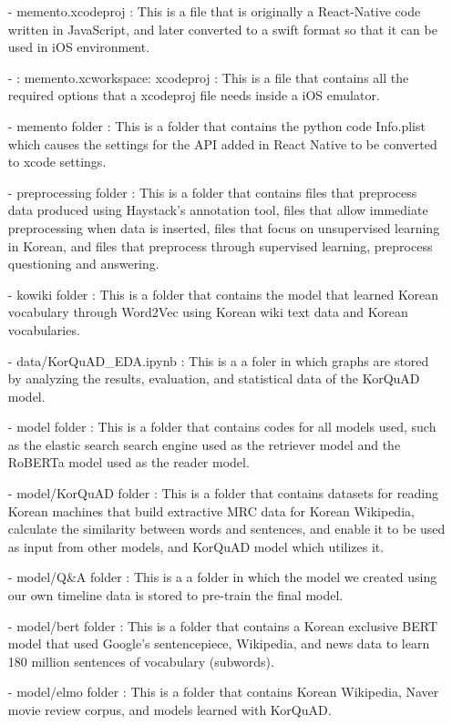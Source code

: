 \documentclass[conference]{IEEEtran}
\begin{document}
\begin{enumerate}
        \item[-] memento.xcodeproj : This is a file that is originally a React-Native code written in JavaScript, and later converted to a swift format so that it can be used in iOS environment.\\
        \item[-] : memento.xcworkspace: xcodeproj : This is a file that contains all the required options that a xcodeproj file needs inside a iOS emulator.\\
        \item[-] memento folder : This is a folder that contains the python code Info.plist which causes the settings for the API added in React Native to be converted to xcode settings.\\
        \item[-] preprocessing folder : This is a folder that contains files that preprocess data produced using Haystack's annotation tool, files that allow immediate preprocessing when data is inserted, files that focus on unsupervised learning in Korean, and files that preprocess through supervised learning, preprocess questioning and answering.\\
        \item [-] kowiki folder : This is a folder that contains the model that learned Korean vocabulary through Word2Vec using Korean wiki text data and Korean vocabularies.\\
        \item [-] data/KorQuAD\_EDA.ipynb : This is a a foler in which graphs are stored by analyzing the results, evaluation, and statistical data of the KorQuAD model.\\
        \item [-] model folder : This is a folder that contains codes for all models used, such as the elastic search search engine used as the retriever model and the RoBERTa model used as the reader model.\\
        \item [-] model/KorQuAD folder : This is a folder that contains datasets for reading Korean machines that build extractive MRC data for Korean Wikipedia, calculate the similarity between words and sentences, and enable it to be used as input from other models, and KorQuAD model which utilizes it.\\
        \item [-] model/Q\&A folder : This is a a folder in which the model we created using our own timeline data is stored to pre-train the final model.\\
        \item [-] model/bert folder : This is a folder that contains a Korean exclusive BERT model that used Google's sentencepiece, Wikipedia, and news data to learn 180 million sentences of vocabulary (subwords).\\
        \item [-] model/elmo folder : This is a folder that contains Korean Wikipedia, Naver movie review corpus, and models learned with KorQuAD.\\
        
\end{enumerate}
\end{document}
